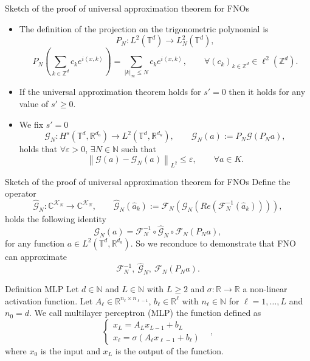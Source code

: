 \documentclass{beamer}
\newcommand{\numberset}{\mathbb}
\newcommand{\N}{\numberset{N}}
\newcommand{\Z}{\numberset{Z}}
\newcommand{\R}{\numberset{R}}
\newcommand{\C}{\numberset{C}}
\begin{document}
\begin{frame}[noframenumbering]{Sketch of the proof of universal approximation theorem for FNOs}
	\centering
	\begin{itemize}
		\item The definition of the projection on the trigonometric polynomial is
		\[ P_N: L^{2}(\mathbb{T}^d) \to L^{2}_N(\mathbb{T}^d),  \]
		\[ P_N\left(\sum_{k \in \Z^d} c_k e^{i \left\langle x, k \right\rangle } \right) = \sum_{|k|_{\infty}\le N} c_k e^{i \left\langle x, k \right\rangle }, \qquad \forall (c_k)_{k \in \Z^d} \in \ell^2(\Z^d). \]
		\item If the universal approximation theorem holds for $ s'=0 $ then it holds for any value of $ s' \ge 0 $.
		\item We fix $ s' = 0 $  \[ \mathcal{G}_{N}: H^{s}(\mathbb{T}^d, \R^{d_a}) \to L^2(\mathbb{T}^d, \R^{d_u}), \qquad \mathcal{G}_{N}(a):= P_N  \mathcal{G} (P_Na), \]
		holds that $ \forall \varepsilon > 0 $, $ \exists N \in \N $ such that
		\[ \left\|\mathcal{G}(a) - \mathcal{G}_N(a) \right\|_{L^2} \le \varepsilon, \qquad \forall a \in K. \]
	\end{itemize}
\end{frame}


\begin{frame}[noframenumbering]{Sketch of the proof of universal approximation theorem for FNOs}
	Define the operator
	\[ \widehat{\mathcal{G}}_N: \C^{\mathcal{K}_N} \to\C^{\mathcal{K}_N}, \qquad \widehat{\mathcal{G}}_N(\widehat{a}_k) := \mathcal{F}_N (\mathcal{G}_N ( Re (\mathcal{F}_N^{-1}(\widehat{a}_k)))), \]
	holds the following identity
	\[ \mathcal{G}_N (a) = \mathcal{F}_N^{-1} \circ \widehat{\mathcal{G}}_N \circ \mathcal{F}_N (P_Na), \]
	for any function $  a \in L^2(\mathbb{T}^d, \R^{d_a}) $. So we reconduce to demonstrate that FNO can approximate	\[ \mathcal{F}_N^{-1}, \ \widehat{\mathcal{G}}_N , \ \mathcal{F}_N (P_Na). \]
\end{frame}


\begin{frame}[noframenumbering]{Definition MLP}
	Let $ d \in \N $ and $ L\in \N $ with $ L \ge 2 $ and $ \sigma : \R \to \R  $ a non-linear activation function. Let $ A_{\ell} \in \R^{n_{\ell}\times n_{\ell-1}} $, $ b_{\ell} \in \R^{\ell} $ with $ n_{\ell}\in \N $ for $ \ell = 1, \dots, L $	and $ n_{0} = d $. We call multilayer perceptron (MLP) the function defined as
	\[ \begin{cases}
		x_{L} = A_{L}x_{L-1} + b_{L} \qquad & \\
		x_{\ell} = \sigma\left( A_{\ell}x_{\ell-1} + b_{\ell} \right) 
	\end{cases}, \]
	where $ x_0 $ is the input and $ x_{L} $ is the output of the function.
\end{frame}
\end{document}

